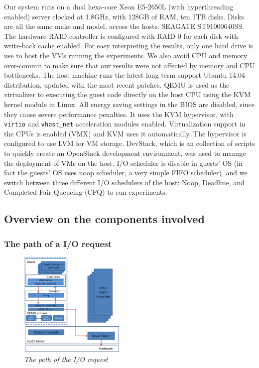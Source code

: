 \documentclass{acmsig}
\begin{document}
Our system runs on a dual hexa-core Xeon E5-2650L (with hyperthreading enabled) server clocked at 1.8GHz, with 128GB of RAM, ten 1TB disks. Disks are all the same make and model, across the hosts: SEAGATE ST91000640SS. The hardware RAID controller is configured with RAID 0 for each disk with write-back cache enabled. For easy interpreting the results, only one hard drive is use to host the VMs running the experiments. We also avoid  CPU and memory over-commit to make sure that our results were not affected by memory and CPU bottlenecks. The host machine runs the latest long term support Ubuntu 14.04 distribution, updated with the most recent patches. QEMU is used as the virtualizer to executing the guest code directly on the host CPU using the KVM kernel module in Linux. All energy saving settings in the BIOS are disabled, since they cause severe performance penalties. It uses the KVM hypervisor, with \texttt{virtio} and \texttt{vhost\_net} acceleration modules enabled. Virtualization support in the CPUs is enabled (VMX) and KVM uses it automatically. The hypervisor is configured to use LVM for VM storage. DevStack, which is an collection of scripts to quickly create an OpenStack development environment, was used to manage the deployment of VMs on the host. I/O scheduler is disable in guests' OS (in fact the guests' OS uses noop scheduler, a very simple FIFO scheduler), and we switch between three different I/O schedulers of the host: Noop, Deadline, and Completed Fair Queueing (CFQ) to run experiments.
\subsection{Overview on the components involved}

  \subsubsection{The path of a I/O request}

  \begin{figure}[htbp]
    \centering
    \includegraphics[width=0.45\textwidth]{figures/iopath.png}
    \caption{\textit{The path of the I/O request }}
    \label{iopath}
  \end{figure}
\end{document}
